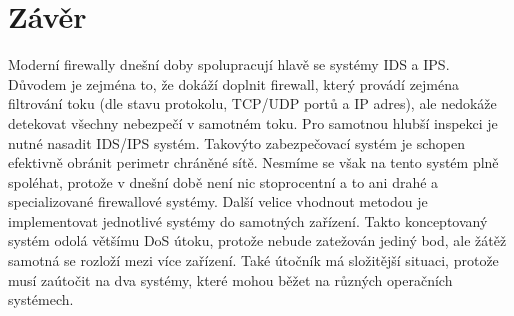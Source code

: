 \documentclass[11pt,a4paper]{article}
\begin{document}
\section{Závěr}
Moderní firewally dnešní doby spolupracují hlavě se systémy IDS a IPS. Důvodem je zejména to, že dokáží doplnit firewall, který provádí zejména filtrování toku (dle stavu protokolu, TCP/UDP portů a IP adres), ale nedokáže detekovat všechny nebezpečí v samotném toku. Pro samotnou hlubší inspekci je nutné nasadit IDS/IPS systém. Takovýto zabezpečovací systém je schopen efektivně obránit perimetr chráněné sítě. Nesmíme se však na tento systém plně spoléhat, protože v dnešní době není nic stoprocentní a to ani drahé a specializované firewallové systémy. Další velice vhodnout metodou je implementovat jednotlivé systémy do samotných zařízení. Takto konceptovaný systém odolá většímu DoS útoku, protože nebude zatežován jediný bod, ale žátěž samotná se rozloží mezi více zařízení. Také útočník má složitější situaci, protože musí zaútočit na dva systémy, které mohou běžet na různých operačních systémech.
\nocite{*}
{
	\def\CS{$\cal C\kern-0.1667em\lower.5ex\hbox{$\cal S$}\kern-0.075em $}
	
}
\end{document}
